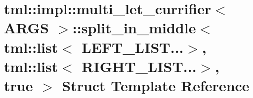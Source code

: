 \hypertarget{structtml_1_1impl_1_1multi__let__currifier_1_1split__in__middle_3_01tml_1_1list_3_01LEFT__LIST_84d079acf935021ec0ffe69943a037410}{\section{tml\+:\+:impl\+:\+:multi\+\_\+let\+\_\+currifier$<$ A\+R\+G\+S $>$\+:\+:split\+\_\+in\+\_\+middle$<$ tml\+:\+:list$<$ L\+E\+F\+T\+\_\+\+L\+I\+S\+T...$>$, tml\+:\+:list$<$ R\+I\+G\+H\+T\+\_\+\+L\+I\+S\+T...$>$, true $>$ Struct Template Reference}
\label{structtml_1_1impl_1_1multi__let__currifier_1_1split__in__middle_3_01tml_1_1list_3_01LEFT__LIST_84d079acf935021ec0ffe69943a037410}
}
